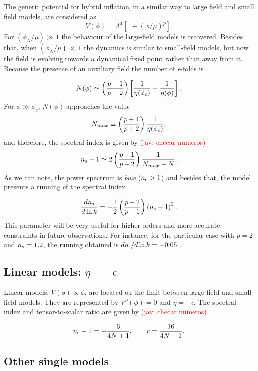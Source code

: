 \documentclass{rmaa}
\def\beq{\begin{equation}}
\def\eeq{\end{equation}}
\newcommand{\jav}[1]{\textcolor{red}{(jav: #1)}}
\begin{document}
The generic potential for hybrid inflation, in a similar way to large field and small field models,
are considered as
\begin{equation}
V\left(\phi\right) = \Lambda^4 \left[1 + \left(\phi / \mu\right)^p\right].
\end{equation}
%
For $\left({\phi_N / \mu}\right)\gg 1$ the behaviour of
 the large-field models is recovered. Besides that, when $\left({\phi_N /
\mu}\right)\ll 1$ the dynamics is similar to small-field models, but
now the field is evolving towards a dynamical fixed point rather than away from it.  
%
Because the presence of an auxiliary field the number of {\it e}-folds is

\beq
N(\phi)\simeq \left( {p+1 \over p+2} \right)\left[ {1 \over \eta(\phi_c) }- {1 \over \eta(\phi)}\right]. 
\eeq
%
For $\phi \gg \phi_c$, $N(\phi)$ approaches the value
%
\beq
N_{max}\equiv \left( {p+1 \over p+2} \right) {1 \over \eta (\phi_c)},
\eeq
%
and therefore, the spectral index is given by \jav{checar numeros}
 $$
n_{\rm s}-1 \simeq 2 \left( \frac{p+1}{p+2}\right) \frac{1}{N_{max}-N}.
 $$
%
As we can note, the power spectrum is \textit{blue} ($n_{\rm s}>1$) and besides that, the model presents 
a running of the spectral index

\begin{equation}
\label{eq:dsirunning}
{dn_{\rm s} \over d\ln{k}} = -{1 \over 2} \left({p + 2 \over p + 1}\right) 
\left(n_{\rm s} - 1\right)^2.
\end{equation}
%
 This parameter  will be very useful for higher orders and more accurate constraints in 
 future observations. For instance, for the particular case with $p = 2$ 
 and $n_{\rm s} = 1.2$, the running obtained is $dn_{\rm s} / d\ln{k} = -0.05$ \citep{Kinney3}. 

\subsection{Linear models: $\eta = - \epsilon$}


Linear models, $V\left(\phi\right) \propto \phi$, are located on the limit between
large field and small field models. They are represented by $V''\left(\phi\right) = 0$ and $\eta =
- \epsilon$. The spectral index and tensor-to-scalar ratio are given by \jav{checar numeros}

\beq
n_{\rm s}-1=-{6\over 4N+1},\qquad
r = {16 \over 4N+1} .
\eeq

\subsection{Other single models}
\end{document}
